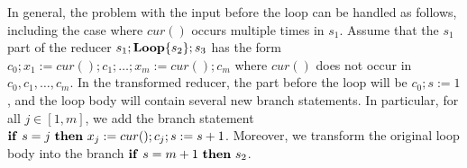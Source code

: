 \documentclass{llncs}
\newcommand{\cur}{cur()}
\newcommand{\IF}[2]{
	\ifmmode
	\mathbf{if}\ #1 \ \mathbf{then}\ #2
	\else
	\textbf{if}\ #1 \ \textbf{then}\ #2
	\fi}
\newcommand{\rloop}{
	\ifmmode
	\mathbf{Loop}
	\else
	\textbf{Loop}
	\fi}
\begin{document}
%			


In general, the problem with the input before the loop can be handled as
follows, including the case where $\cur$ occurs multiple times in $s_1$. Assume
that the $s_1$ part of the reducer $s_1;\rloop\{s_2\};s_3$ has the form
$c_0;x_{1}{:=} \cur;c_1; \ldots; x_{m}{:=}\cur;c_m$ where $\cur$ does not occur
in $c_0,c_1,\ldots, c_m$. In the transformed reducer, the part before the loop
will be $c_0;s:=1$, and the loop body will contain several new branch
statements. In particular, for all $j \in [1,m]$, we add the branch statement
$\IF{s=j}{x_{j}:=\cur; c_j; s:=s+1}$. Moreover, we transform the original loop
body into the branch $\IF{s=m+1}{s_2}$.

\end{document}
